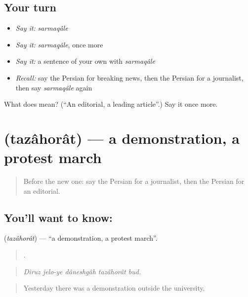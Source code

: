 \subsection*{Your turn}
\begin{itemize}
\raggedright
  \item \emph{Say it:} \emph{sarmaqâle}
  \item \emph{Say it:} \emph{sarmaqâle}, once more
  \item \emph{Say it:} a sentence of your own with \emph{sarmaqâle}
  \item \emph{Recall:} say the Persian for breaking news, then the Persian for a journalist, then say \emph{sarmaqâle} again
\end{itemize}

\begin{tcolorbox}[breakable,colback=teal!4,colframe=teal!35!black,title={Before you move on}]
What does  mean? (\textquotedblleft{}An editorial, a leading article\textquotedblright{}.) Say it once more.
\end{tcolorbox}
\section[\texorpdfstring{\fa{تظاهرات} (tazâhorât)}{تظاهرات (tazâhorât)}]{ (tazâhorât) — a demonstration, a protest march}

\label{lesson:FA-C315-tazahorat}



\begin{quote}
Before the new one: say the Persian for a journalist, then the Persian for an editorial.
\end{quote}

\subsection*{You'll want to know: }
\textbf{} (\emph{tazâhorât}) — \textquotedblleft{}a demonstration, a protest march\textquotedblright{}.

\begin{quote}
    .
\end{quote}

\begin{quote}
\emph{Diruz jelo-ye dâneshgâh tazâhorât bud.}
\end{quote}

\begin{quote}
Yesterday there was a demonstration outside the university.
\end{quote}

